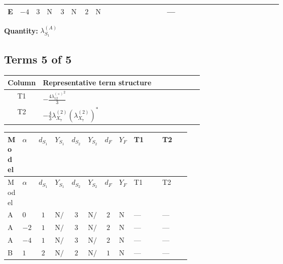 \documentclass[8pt]{article}
\begin{document}
\begin{landscape}
\begin{longtable}{@{}llcccccc >{\raggedright\arraybackslash}p{0.21\linewidth} >{\raggedright\arraybackslash}p{0.21\linewidth} >{\raggedright\arraybackslash}p{0.21\linewidth}@{}}
\midrule
E & $-4$ & $3$ & $\text{N/A}$ & $3$ & $\text{N/A}$ & $2$ & $\text{N/A}$ & \scriptsize\adjustbox{max width=\linewidth}{$\begin{gathered} +{g_1}^2 \left(32 {g_2}^2-48 {\lambda_{S_1}^{(A)}}\right)\end{gathered}$} & --- & \scriptsize\adjustbox{max width=\linewidth}{$\begin{gathered} +12 {\lambda_{12}^{(A)}}^2\end{gathered}$} \\
\midrule
\bottomrule
\end{longtable}
\clearpage
\noindent\textbf{Quantity: }$\lambda_{S_1}^{(A)}$\par\smallskip
\subsection*{Terms 5 of 5}
\begin{center}
\begin{tabular}{@{}c >{\raggedright\arraybackslash}p{0.82\linewidth}@{}}
\toprule
Column & Representative term structure \\
\midrule
T1 & \(\displaystyle -\frac{4 {\lambda_{12}^{(\times)}}^2}{3}\) \\
\midrule
T2 & \(\displaystyle -\frac{4}{3} {\lambda_{X_{7}}^{(2)}} \left({\lambda_{X_{7}}^{(2)}}\right)^{*}\) \\
\midrule
\bottomrule
\end{tabular}
\end{center}
\smallskip
\tiny
\begin{longtable}{@{}llcccccc >{\raggedright\arraybackslash}p{0.21\linewidth} >{\raggedright\arraybackslash}p{0.21\linewidth}@{}}
\toprule
Model & $\alpha$ & $d_{S_1}$ & $Y_{S_1}$ & $d_{S_2}$ & $Y_{S_2}$ & $d_F$ & $Y_F$ & T1 & T2 \\
\midrule
\endfirsthead
\toprule
Model & $\alpha$ & $d_{S_1}$ & $Y_{S_1}$ & $d_{S_2}$ & $Y_{S_2}$ & $d_F$ & $Y_F$ & T1 & T2 \\
\midrule
\endhead
A & $0$ & $1$ & $\text{N/A}$ & $3$ & $\text{N/A}$ & $2$ & $\text{N/A}$ & --- & --- \\
\midrule
A & $-2$ & $1$ & $\text{N/A}$ & $3$ & $\text{N/A}$ & $2$ & $\text{N/A}$ & --- & --- \\
\midrule
A & $-4$ & $1$ & $\text{N/A}$ & $3$ & $\text{N/A}$ & $2$ & $\text{N/A}$ & --- & --- \\
\midrule
B & $1$ & $2$ & $\text{N/A}$ & $2$ & $\text{N/A}$ & $1$ & $\text{N/A}$ & --- & --- \\

\end{longtable}
\end{landscape}
\end{document}
